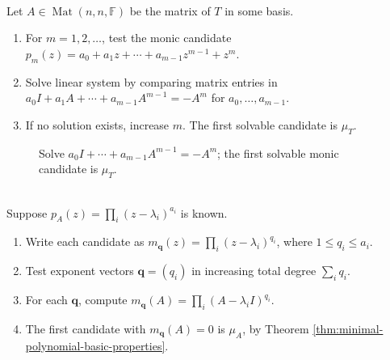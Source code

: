 \begin{method} \label{meth:operator-minimal-polynomial-from-matrix} \\
Let $A\in\operatorname{Mat}(n,n,\mathbb{F})$ be the matrix of $T$ in some basis.
\begin{enumerate}[label=(\roman*)]
\setlength{\itemsep}{0pt}
\item For $m=1,2,\ldots$, test the monic candidate $p_m(z)=a_0+a_1z+\cdots+a_{m-1}z^{m-1}+z^m$.
\item Solve linear system by comparing matrix entries in $a_0I+a_1A+\cdots+a_{m-1}A^{m-1}=-A^m$ for $a_0,\ldots,a_{m-1}$.
\item If no solution exists, increase $m$. The first solvable candidate is $\mu_T$.
\end{enumerate}
\end{method}

\begin{figure}[H]
  \centering
  
  \caption{Solve $a_0I+\cdots+a_{m-1}A^{m-1}=-A^m$; the first solvable monic candidate is $\mu_T$.}
  \label{fig:minimal-polynomial-linear-system}
\end{figure}

\begin{method} \label{meth:minimal-polynomial-testing-from-characteristic-polynomial} \\
Suppose $p_A(z)=\prod_i(z-\lambda_i)^{a_i}$ is known.
\begin{enumerate}[label=\roman*.]
\setlength{\itemsep}{0pt}
\item Write each candidate as $m_{\mathbf{q}}(z)=\prod_i(z-\lambda_i)^{q_i}$, where $1\leq q_i\leq a_i$.
\item Test exponent vectors $\mathbf{q}=(q_i)$ in increasing total degree $\sum_iq_i$.
\item For each $\mathbf{q}$, compute $m_{\mathbf{q}}(A)=\prod_i(A-\lambda_iI)^{q_i}$.
\item The first candidate with $m_{\mathbf{q}}(A)=0$ is $\mu_A$, by Theorem \ref{thm:minimal-polynomial-basic-properties}.
\end{enumerate}
\end{method}

